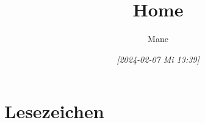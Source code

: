 \documentclass[11pt]{article}
\author{Mane}
\date{\textit{[2024-02-07 Mi 13:39]}}
\title{Home}
\begin{document}
\maketitle
\tableofcontents

\section*{Lesezeichen}
\label{sec:orgb94a460}
\end{document}
